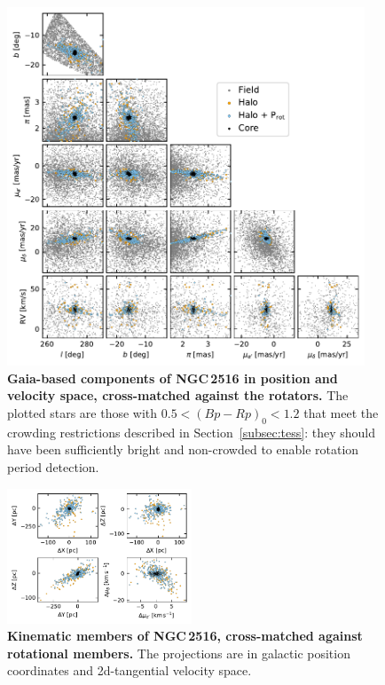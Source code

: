 \documentclass[12pt,twocolumn,tighten]{aastex63}
\begin{document}
\begin{figure}[t]
	\begin{center}
		\leavevmode
		\includegraphics[width=0.95\textwidth]{f4.pdf}
	\end{center}
	\vspace{-0.7cm}
	\caption{ {\bf Gaia-based components of NGC\,2516 in position and
    velocity space, cross-matched against the rotators.}
    The plotted stars are those with $0.5<(Bp-Rp)_0<1.2$ that meet the
    crowding restrictions described in Section~\ref{subsec:tess}: they
    should have been sufficiently bright and non-crowded to enable
    rotation period detection.
		\label{fig:gaia6d_x_rotn}
	}
\end{figure}

\begin{figure}[t]
	\begin{center}
			\includegraphics[width=0.49\textwidth]{f8a.pdf}
	\end{center}
	\vspace{-0.7cm}
  \caption{ {\bf Kinematic members of NGC\,2516, cross-matched against
  rotational members.}
    The projections are in galactic position coordinates and 2d-tangential velocity
    space.
    \label{fig:physical_x_rotn}
	}
\end{figure}
\end{document}
